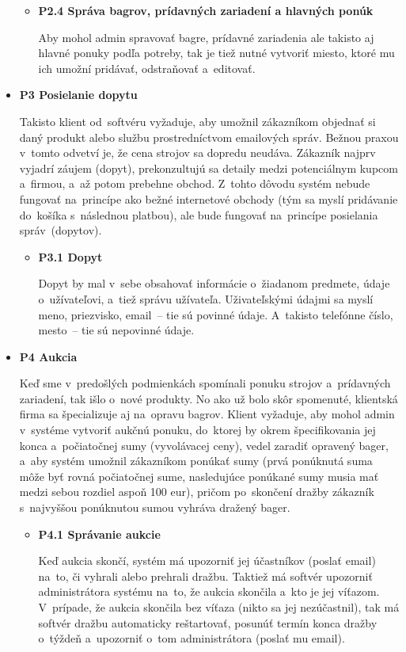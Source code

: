 \begin{itemize}
\begin{itemize}
\item \textbf{P2.4 Správa bagrov, prídavných zariadení a hlavných ponúk}

Aby mohol admin spravovať bagre, prídavné zariadenia ale takisto aj hlavné ponuky podľa potreby, tak je tiež nutné vytvoriť miesto, ktoré mu ich umožní pridávať, odstraňovať a~editovať.
\end{itemize}

\item \textbf{P3 Posielanie dopytu}

Takisto klient od~softvéru vyžaduje, aby umožnil zákazníkom objednať si daný produkt alebo službu prostredníctvom emailových správ. Bežnou praxou v~tomto odvetví je, že cena strojov sa dopredu neudáva. Zákazník najprv vyjadrí záujem (dopyt), prekonzultujú sa detaily medzi potenciálnym kupcom a~firmou, a~až potom prebehne obchod. Z~tohto dôvodu systém nebude fungovať na~princípe ako bežné internetové obchody (tým sa myslí pridávanie do~košíka s~následnou platbou), ale bude fungovať na~princípe posielania správ~(dopytov).

\begin{itemize}
\item \textbf{P3.1 Dopyt}

Dopyt by mal v~sebe obsahovať informácie o~žiadanom predmete, údaje o~užívateľovi, a~tiež správu užívateľa. Uživateľskými údajmi sa myslí meno, priezvisko, email~-- tie sú povinné údaje. A~takisto telefónne číslo, mesto~-- tie sú nepovinné údaje.
\end{itemize}

\item \textbf{P4 Aukcia}

Keď sme v~predošlých podmienkách spomínali ponuku strojov a~prídavných zariadení, tak išlo o~nové produkty. No ako už bolo skôr spomenuté, klientská firma sa špecializuje aj na~opravu bagrov. Klient vyžaduje, aby mohol admin v~systéme vytvoriť aukčnú ponuku, do~ktorej by okrem špecifikovania jej konca a~počiatočnej sumy (vyvolávacej ceny), vedel zaradiť opravený bager, a~aby systém umožnil zákazníkom ponúkať sumy (prvá ponúknutá suma môže byť rovná počiatočnej sume, nasledujúce ponúkané sumy musia mať medzi sebou rozdiel aspoň 100 eur), pričom po~skončení dražby zákazník s~najvyššou ponúknutou sumou vyhráva dražený bager.

\begin{itemize}
\item \textbf{P4.1 Správanie aukcie}

Keď aukcia skončí, systém má upozorniť jej účastníkov (poslať email) na~to, či vyhrali alebo prehrali dražbu. Taktiež má softvér upozorniť administrátora systému na~to, že aukcia skončila a~kto je jej víťazom. V~prípade, že aukcia skončila bez víťaza (nikto sa jej nezúčastnil), tak má softvér dražbu automaticky reštartovať, posunúť termín konca dražby o~týždeň a~upozorniť o~tom administrátora (poslať mu email).


\end{itemize}
\end{itemize}
